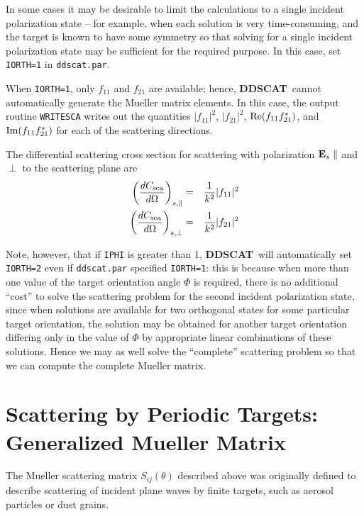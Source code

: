 In some cases it may be desirable to limit the calculations to a
single incident polarization state -- for example, when each solution
is very time-consuming, and the target is known to have some symmetry
so that solving for a single incident polarization state may be
sufficient for the required purpose.  In this case, set {\tt IORTH=1}
in {\tt ddscat.par}.

When {\tt IORTH=1}, only $f_{11}$ and $f_{21}$ are available;
hence, {{\bf DDSCAT}}\ cannot
automatically generate the Mueller matrix elements.
In this case, the output routine {\tt WRITESCA} writes out the quantities
$|f_{11}|^2$, $|f_{21}|^2$, ${\rm Re}(f_{11}f_{21}^*)$, and
${\rm Im}(f_{11}f_{21}^*)$ for each of the scattering directions.

The differential scattering cross section for scattering with polarization
${\bf E}_s \parallel$ and $\perp$ to the scattering plane are
\begin{eqnarray}
\left(\frac{dC_{\rm sca}}{d\Omega}\right)_{s,\parallel} &=& \frac{1}{k^2}|f_{11}|^2
\\
\left(\frac{dC_{\rm sca}}{d\Omega}\right)_{s,\perp} &=& \frac{1}{k^2}|f_{21}|^2
\end{eqnarray}

Note, however, that if {\tt IPHI} is greater than 1, {{\bf DDSCAT}}\
will automatically set {\tt IORTH=2} even if {\tt ddscat.par}
specified {\tt IORTH=1}: this is because when more than one value of
the target orientation angle $\Phi$ is required, there is no
additional ``cost'' to solve the scattering problem for the second
incident polarization state, since when solutions are available for
two orthogonal states for some particular target orientation, the
solution may be obtained for another target orientation differing only
in the value of $\Phi$ by appropriate linear combinations of these
solutions.  Hence we may as well solve the ``complete'' scattering
problem so that we can compute the complete Mueller matrix.

\section{Scattering by Periodic Targets: Generalized Mueller Matrix
\label{sec:generalized mueller matrix}}

The Mueller scattering matrix $S_{ij}(\theta)$
described above
was originally defined \citep[see, e.g.,]{Bohren+Huffman_1983} 
to describe scattering of incident plane waves
by finite targets, such as aerosol particles or dust grains.

